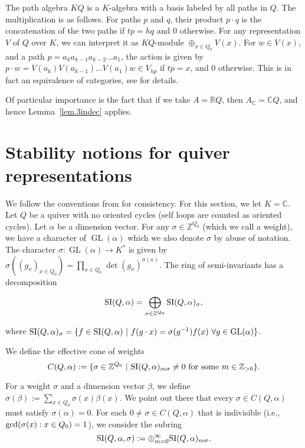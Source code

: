 \documentclass[11pt]{amsart}
\theoremstyle{definition}
\newcommand{\R}{{\mathbb R}}
\newcommand{\SI}{{\rm SI}}
\newcommand{\C}{{\mathbb C}}
\newcommand{\Z}{{\mathbb Z}}
\newcommand{\GL}{\operatorname{GL}}
\begin{document}
The path algebra $KQ$ is a $K$-algebra with a basis labeled by all paths in $Q$. The multiplication is as follows. For paths $p$ and $q$, their product $p \cdot q$ is the concatenation of the two paths if $tp = hq$ and $0$ otherwise. For any representation $V$ of $Q$ over $K$, we can interpret it as $KQ$-module $\oplus_{x \in Q_0} V(x)$. For $w \in V(x)$, and a path $p = a_k a_{k-1} a_{k-2} \dots a_1$, the action is given by $p \cdot w = V(a_k) V(a_{k-1})\dots V(a_1) w \in V_{hp}$ if $tp = x$, and $0$ otherwise. This is in fact an equivalence of categories, see \cite{DW-book} for details.

Of particular importance is the fact that if we take $A = \R Q$, then $A_\C = \C Q$, and hence Lemma~\ref{lem.3indec} applies.


















\section{Stability notions for quiver representations} \label{sec:stability}
We follow the conventions from \cite{DW-book} for consistency. For this section, we let $K =\C$. Let $Q$ be a quiver with no oriented cycles (self loops are counted as oriented cycles). Let $\alpha$ be a dimension vector. For any $\sigma \in \Z^{Q_0}$ (which we call a weight), we have a character of $\GL(\alpha)$ which we also denote $\sigma$ by abuse of notation. The character $\sigma: \GL(\alpha) \rightarrow K^*$ is given by $\sigma((g_x)_{x \in Q_0}) = \prod_{x \in Q_0} \det(g_x)^{\sigma(x)}$. The ring of semi-invariants has a decomposition

$$
{\rm SI}(Q,\alpha) = \bigoplus_{\sigma \in \Z^{Q_0}} {\rm SI}(Q,\alpha)_\sigma,
$$

where $\SI(Q,\alpha)_\sigma = \{f \in {\rm SI}(Q,\alpha) \ |\ f(g \cdot x) = \sigma(g^{-1}) f(x)\  \forall g \in \GL(\alpha)\}$.

We define the effective cone of weights 
$$
C(Q,\alpha) := \{\sigma \in \Z^{Q_0}\ |\ {\rm SI}(Q,\alpha)_{m\sigma} \neq 0\ \text{for some } m \in \Z_{>0}\}.
$$

For a weight $\sigma$ and a dimension vector $\beta$, we define $\sigma(\beta) := \sum_{x \in Q_0} \sigma(x) \beta(x)$. We point out there that every $\sigma \in C(Q,\alpha)$ must satisfy $\sigma(\alpha) = 0$. For each $0 \neq \sigma \in C(Q,\alpha)$ that is indivisible (i.e., ${\rm gcd}(\sigma(x) : x \in Q_0) = 1$), we consider the subring
$$
\SI(Q,\alpha,\sigma) := \oplus_{m=0}^\infty \SI(Q,\alpha)_{m\sigma}.
$$
\end{document}
